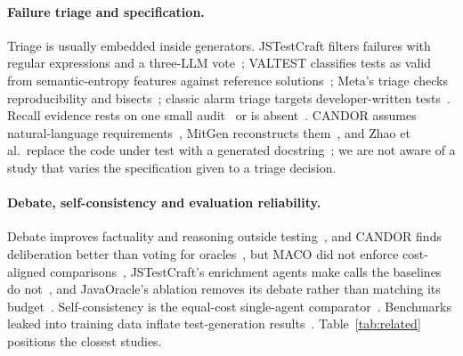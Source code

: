 \documentclass[pdflatex,iicol,sn-mathphys-num]{sn-jnl}
\begin{document}
\paragraph{Failure triage and specification.} Triage is usually embedded inside generators. JSTestCraft filters failures with regular expressions and a three-LLM vote~\cite{liu2026jstestcraft}; VALTEST classifies tests as valid from semantic-entropy features against reference solutions~\cite{taherkhani2026valtest}; Meta's triage checks reproducibility and bisects~\cite{maddila2026agentic}; classic alarm triage targets developer-written tests~\cite{herzig2015alarms,jiang2017alarm}. Recall evidence rests on one small audit~\cite{liu2026jstestcraft} or is absent~\cite{fu2026javaoracle}. CANDOR assumes natural-language requirements~\cite{xu2026candor}, MitGen reconstructs them~\cite{li2026mitgen}, and Zhao et al.\ replace the code under test with a generated docstring~\cite{zhao2026misguidance}; we are not aware of a study that varies the specification given to a triage decision.

\paragraph{Debate, self-consistency and evaluation reliability.} Debate improves factuality and reasoning outside testing~\cite{du2024debate}, and CANDOR finds deliberation better than voting for oracles~\cite{xu2026candor}, but MACO did not enforce cost-aligned comparisons~\cite{xie2026maco}, JSTestCraft's enrichment agents make calls the baselines do not~\cite{liu2026jstestcraft}, and JavaOracle's ablation removes its debate rather than matching its budget~\cite{fu2026javaoracle}. Self-consistency is the equal-cost single-agent comparator~\cite{wang2023selfconsistency}. Benchmarks leaked into training data inflate test-generation results~\cite{huang2026ult}. Table~\ref{tab:related} positions the closest studies.
\end{document}
